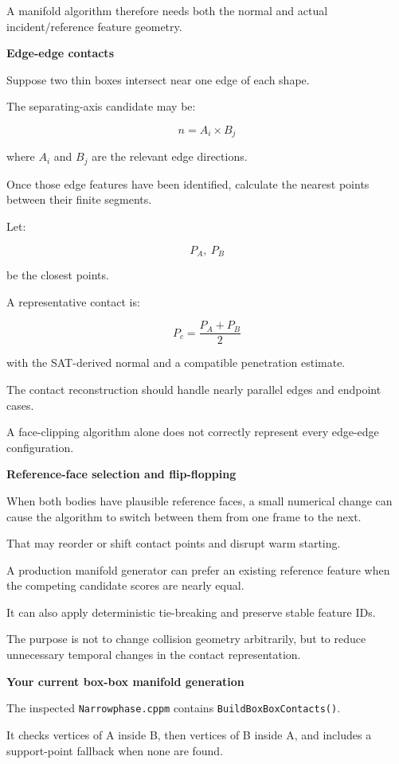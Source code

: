 A manifold algorithm therefore needs both the normal and actual incident/reference feature geometry.

\textbf{Edge-edge contacts}

Suppose two thin boxes intersect near one edge of each shape.

The separating-axis candidate may be:

\[
n=A_i\times B_j
\]

where \(A_i\) and \(B_j\) are the relevant edge directions.

Once those edge features have been identified, calculate the nearest points between their finite segments.

Let:

\[
P_A,\ P_B
\]

be the closest points.

A representative contact is:

\[
P_c=\frac{P_A+P_B}{2}
\]

with the SAT-derived normal and a compatible penetration estimate.

The contact reconstruction should handle nearly parallel edges and endpoint cases.

A face-clipping algorithm alone does not correctly represent every edge-edge configuration.

\textbf{Reference-face selection and flip-flopping}

When both bodies have plausible reference faces, a small numerical change can cause the algorithm to switch between them from one frame to the next.

That may reorder or shift contact points and disrupt warm starting.

A production manifold generator can prefer an existing reference feature when the competing candidate scores are nearly equal.

It can also apply deterministic tie-breaking and preserve stable feature IDs.

The purpose is not to change collision geometry arbitrarily, but to reduce unnecessary temporal changes in the contact representation.

\textbf{Your current box-box manifold generation}

The inspected \texttt{Narrowphase.cppm} contains \texttt{BuildBoxBoxContacts()}.

It checks vertices of A inside B, then vertices of B inside A, and includes a support-point fallback when none are found.

